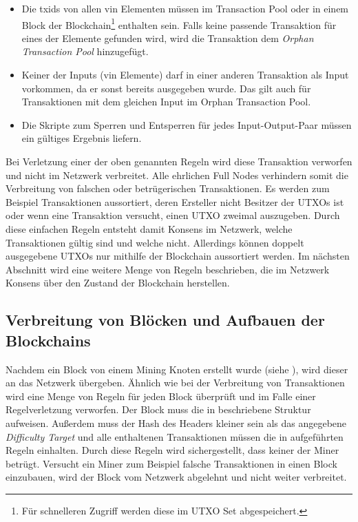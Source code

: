 \documentclass[ngerman,runningheads,a4paper]{llncs}[2018/03/10]
\begin{document}
\begin{itemize}

\item Die txids von allen vin Elementen müssen im Transaction Pool oder in einem Block der Blockchain\footnote{Für schnelleren Zugriff werden diese im UTXO Set abgespeichert.} enthalten sein. Falls keine passende Transaktion für eines der Elemente gefunden wird, wird die Transaktion dem \textit{Orphan Transaction Pool} hinzugefügt.

\item Keiner der Inputs (vin Elemente) darf in einer anderen Transaktion als Input vorkommen, da er sonst bereits ausgegeben wurde. Das gilt auch für Transaktionen mit dem gleichen Input im Orphan Transaction Pool.

\item Die Skripte zum Sperren und Entsperren für jedes Input-Output-Paar müssen ein gültiges Ergebnis liefern.

\end{itemize}

Bei Verletzung einer der oben genannten Regeln wird diese Transaktion verworfen und nicht im Netzwerk verbreitet. Alle ehrlichen Full Nodes verhindern somit die Verbreitung von falschen oder betrügerischen Transaktionen. Es werden zum Beispiel Transaktionen aussortiert, deren Ersteller nicht Besitzer der UTXOs ist oder wenn eine Transaktion versucht, einen UTXO zweimal auszugeben. Durch diese einfachen Regeln entsteht damit Konsens im Netzwerk, welche Transaktionen gültig sind und welche nicht. Allerdings können doppelt ausgegebene UTXOs nur mithilfe der Blockchain aussortiert werden. Im nächsten Abschnitt wird eine weitere Menge von Regeln beschrieben, die im Netzwerk Konsens über den Zustand der Blockchain herstellen.

\subsection{Verbreitung von Blöcken und Aufbauen der Blockchains}\label{sec:blockverbreitung}

Nachdem ein Block von einem Mining Knoten erstellt wurde (siehe ), wird dieser an das Netzwerk übergeben. Ähnlich wie bei der Verbreitung von Transaktionen wird eine Menge von Regeln für jeden Block überprüft und im Falle einer Regelverletzung verworfen. Der Block muss die in  beschriebene Struktur aufweisen. Außerdem muss der Hash des Headers kleiner sein als das angegebene \textit{Difficulty Target} und alle enthaltenen Transaktionen müssen die in  aufgeführten Regeln einhalten. Durch diese Regeln wird sichergestellt, dass keiner der Miner betrügt. Versucht ein Miner zum Beispiel falsche Transaktionen in einen Block einzubauen, wird der Block vom Netzwerk abgelehnt und nicht weiter verbreitet.
\end{document}
